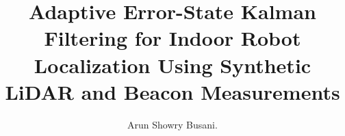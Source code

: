 \documentclass[twocolumn]{aastex701}
\begin{document}
\title{Adaptive Error-State Kalman Filtering for Indoor Robot Localization Using Synthetic LiDAR and Beacon Measurements}

\author{Arun Showry Busani.}

\begin{abstract}

\end{abstract}













\end{document}
